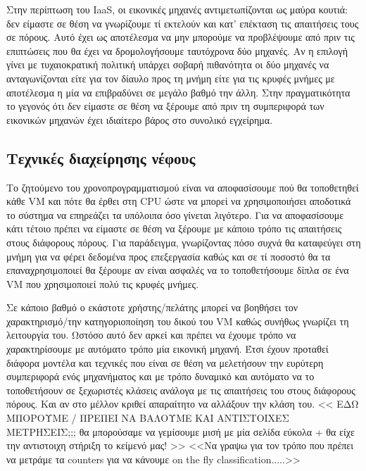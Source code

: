 Στην περίπτωση του IaaS, οι εικονικές μηχανές αντιμετωπίζονται ως μαύρα κουτιά:
δεν είμαστε σε θέση να γνωρίζουμε τί εκτελούν και κατ' επέκταση τις
απαιτήσεις τους σε πόρους. Αυτό έχει ως αποτέλεσμα να μην μπορούμε να
προβλέψουμε από πριν τις επιπτώσεις που θα έχει να δρομολογήσουμε ταυτόχρονα δύο
μηχανές. Αν η επιλογή γίνει με τυχαιοκρατική πολιτική υπάρχει σοβαρή πιθανότητα
οι δύο μηχανές να ανταγωνίζονται είτε για τον δίαυλο προς τη μνήμη είτε για τις
κρυφές μνήμες με αποτέλεσμα η μία να επιβραδύνει σε μεγάλο βαθμό την άλλη. Στην
πραγματικότητα το γεγονός ότι δεν είμαστε σε θέση να ξέρουμε από πριν τη
συμπεριφορά των εικονικών μηχανών έχει ιδιαίτερο βάρος στο συνολικό εγχείρημα.
\subsection{Τεχνικές διαχείρησης νέφους}
Το ζητούμενο του χρονοπρογραμματισμού είναι να αποφασίσουμε πού θα τοποθετηθεί
κάθε VM και πότε θα έρθει στη CPU ώστε να μπορεί να χρησιμοποιήσει αποδοτικά το
σύστημα να επηρεάζει τα υπόλοιπα όσο γίνεται λιγότερο. Για να αποφασίσουμε κάτι
τέτοιο πρέπει να είμαστε σε θέση να ξέρουμε με κάποιο τρόπο τις απαιτήσεις
στους διάφορους πόρους. Για παράδειγμα, γνωρίζοντας πόσο συχνά θα καταφεύγει στη
μνήμη για να φέρει δεδομένα προς επεξεργασία καθώς και σε τί ποσοστό θα τα
επαναχρησιμοποιεί θα ξέρουμε αν είναι ασφαλές να το τοποθετήσουμε δίπλα σε ένα
VM που χρησιμοποιεί πολύ τις κρυφές μνήμες.

Σε κάποιο βαθμό ο εκάστοτε χρήστης/πελάτης μπορεί να βοηθήσει τον
χαρακτηρισμό/την κατηγοριοποίηση του δικού του VM καθώς συνήθως γνωρίζει τη
λειτουργία του. Ωστόσο αυτό δεν αρκεί και πρέπει να έχουμε τρόπο να
χαρακτηρίσουμε με αυτόματο τρόπο μία εικονική μηχανή. Έτσι έχουν προταθεί
διάφορα μοντέλα και τεχνικές που είναι σε θέση να μελετήσουν την ευρύτερη
συμπεριφορά ενός μηχανήματος και με τρόπο δυναμικό και αυτόματο να το
τοποθετήσουν σε ξεχωριστές κλάσεις ανάλογα με τις απαιτήσεις του στους διάφορους
πόρους. Και αν στο μέλλον κριθεί απαραίτητο να αλλάξουν την κλάση του.
<<
ΕΔΩ ΜΠΟΡΟΥΜΕ / ΠΡΕΠΕΙ ΝΑ ΒΑΛΟΥΜΕ ΚΑΙ ΑΝΤΙΣΤΟΙΧΕΣ ΜΕΤΡΗΣΕΙΣ;;; θα μπορούσαμε να
γεμίσουμε μισή με μία σελίδα εύκολα + θα είχε την αντιστοιχη στήριξη το κείμενό
μας! >>
<<Να γραψω για τον τρόπο που πρέπει να μετράμε τα counters για να κάνουμε on the
fly classification.....>>

